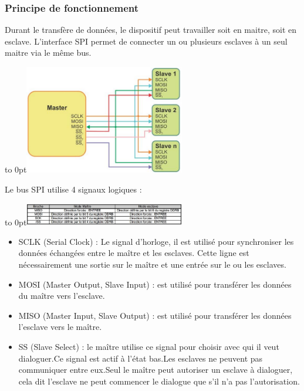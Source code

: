 \documentclass[french,a4paper,12pt]{report}
\begin{document}
			\subsubsection{Principe de fonctionnement}
			
			Durant le transfère de données, le dispositif peut travailler soit en maitre, soit en esclave. L'interface SPI permet de connecter un ou plusieurs esclaves à un seul maitre via le même bus.
 
	\hfill\hbox to 0pt{\hss\includegraphics[width=7cm]{SPI1.png}\hss}\hfill\null\newline
 
	Le bus SPI utilise 4 signaux logiques :
 
	\hfill\hbox to 0pt{\hss\includegraphics[width=7cm]{SPI2.png}\hss}\hfill\null\newline
 
	\begin{itemize}
	\item SCLK (Serial Clock) : Le signal d'horloge, il est utilisé pour synchroniser les données échangées entre le maître et 	les esclaves. Cette ligne est nécessairement une sortie sur le maître et une entrée sur le ou les esclaves.
 
	\item MOSI (Master Output, Slave Input) : est utilisé pour transférer les données du maître vers l'esclave.
 
	\item MISO (Master Input, Slave Output) : est utilisé pour transférer les données l'esclave vers le maître.
 
	\item SS (Slave Select) : le maître utilise ce signal pour choisir avec qui il veut dialoguer.Ce signal est actif à l'état bas.Les esclaves ne peuvent pas communiquer entre eux.Seul le maître peut autoriser un esclave à dialoguer, cela dit l'esclave ne peut commencer le dialogue que s'il n'a pas l'autorisation.
\end{itemize}
 
\end{document}
